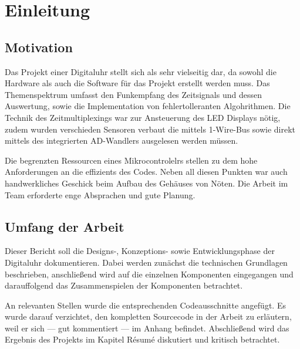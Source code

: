 \section{Einleitung}
\subsection{Motivation}
Das Projekt einer Digitaluhr stellt sich als sehr vielseitig dar, da sowohl die
Hardware als auch die Software für das Projekt erstellt werden muss. Das
Themenspektrum umfasst den Funkempfang des Zeitsignals und dessen Auswertung,
sowie die Implementation von fehlertolleranten Algohrithmen. Die Technik des
Zeitmultiplexings war zur Ansteuerung des LED Displays nötig, zudem
wurden verschieden Sensoren verbaut die mittels 1-Wire-Bus sowie direkt mittels
des integrierten AD-Wandlers ausgelesen werden müssen.

Die begrenzten Ressourcen eines Mikrocontrolelrs stellen zu dem hohe
Anforderungen an die effizients des Codes. Neben all diesen Punkten war auch
handwerkliches Geschick beim Aufbau des Gehäuses von Nöten. Die Arbeit im Team
erforderte enge Absprachen und gute Planung.

\subsection{Umfang der Arbeit}
Dieser Bericht soll die Designs-, Konzeptions- sowie Entwicklungsphase der Digitaluhr dokumentieren. Dabei werden zunächst die technischen Grundlagen beschrieben, anschließend wird auf die einzelnen Komponenten eingegangen und darauffolgend das Zusammenspielen der Komponenten betrachtet. 

An relevanten Stellen wurde die entsprechenden Codeausschnitte angefügt. Es wurde darauf verzichtet, den kompletten Sourcecode in der Arbeit zu erläutern, weil er sich --- gut kommentiert --- im Anhang befindet. Abschließend wird das Ergebnis des Projekts im Kapitel Résumé diskutiert und kritisch betrachtet.